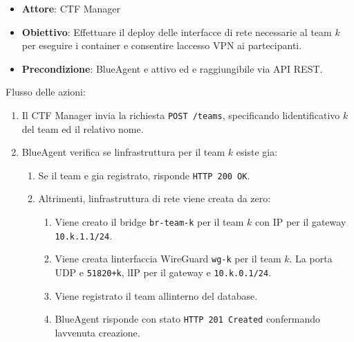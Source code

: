 \begin{itemize}
\tightlist
\item
  \textbf{Attore}: CTF Manager
\item
  \textbf{Obiettivo}: Effettuare il deploy delle interfacce di rete
  necessarie al team \(k\) per eseguire i container e consentire
  l\textquotesingle accesso VPN ai partecipanti.
\item
  \textbf{Precondizione}: BlueAgent e\textquotesingle{} attivo ed
  e\textquotesingle{} raggiungibile via API REST.
\end{itemize}

Flusso delle azioni:

\begin{enumerate}
\def\labelenumi{\arabic{enumi}.}
\tightlist
\item
  Il CTF Manager invia la richiesta
  \passthrough{\lstinline!POST /teams!}, specificando
  l\textquotesingle identificativo \(k\) del team ed il relativo nome.
\item
  BlueAgent verifica se l\textquotesingle infrastruttura per il team
  \(k\) esiste gia:

  \begin{enumerate}
  \def\labelenumii{\arabic{enumii}.}
  \tightlist
  \item
    Se il team e\textquotesingle{} gia registrato, risponde
    \passthrough{\lstinline!HTTP 200 OK!}.
  \item
    Altrimenti, l\textquotesingle infrastruttura di rete viene creata da
    zero:

    \begin{enumerate}
    \def\labelenumiii{\arabic{enumiii}.}
    \tightlist
    \item
      Viene creato il bridge \passthrough{\lstinline!br-team-k!} per il
      team \(k\) con IP per il gateway
      \passthrough{\lstinline!10.k.1.1/24!}.
    \item
      Viene creata l\textquotesingle interfaccia WireGuard
      \passthrough{\lstinline!wg-k!} per il team \(k\). La porta UDP
      e\textquotesingle{} \passthrough{\lstinline!51820+k!},
      l\textquotesingle IP per il gateway e\textquotesingle{}
      \passthrough{\lstinline!10.k.0.1/24!}.
    \item
      Viene registrato il team all\textquotesingle interno del database.
    \item
      BlueAgent risponde con stato
      \passthrough{\lstinline!HTTP 201 Created!} confermando
      l\textquotesingle avvenuta creazione.
    \end{enumerate}
  \end{enumerate}
\end{enumerate}

